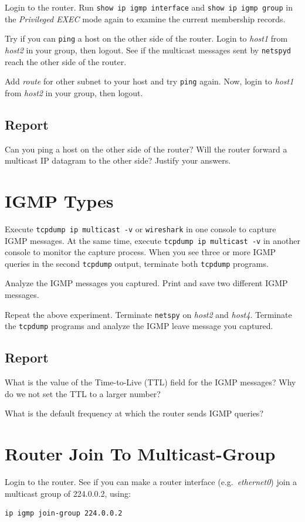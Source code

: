 \documentclass{../UTNetLab}
\begin{document}
    Login to the router.
    Run \lstinline[language={cisco}]{show ip igmp interface} and \lstinline[language={cisco}]{show ip igmp group} in the \textit{Privileged EXEC} mode again to examine the current membership records.

    Try if you can \lstinline{ping} a host on the other side of the router.
    Login to \textit{host1} from \textit{host2} in your group, then logout.
    See if the multicast messages sent by \lstinline{netspyd} reach the other side of the router.

    Add \textit{route} for other subnet to your host and try \lstinline{ping} again. Now, login to \textit{host1} from \textit{host2} in your group, then logout.
    
    \subsection*{Report}
    Can you ping a host on the other side of the router?
    Will the router forward a multicast IP datagram to the other side?
    Justify your answers.

\section{IGMP Types}
    Execute \lstinline{tcpdump ip multicast -v} or \lstinline{wireshark} in one console to capture IGMP messages.
    At the same time, execute \lstinline{tcpdump ip multicast -v} in another console to monitor the capture process.
    When you see three or more IGMP queries in the second \lstinline{tcpdump} output, terminate both \lstinline{tcpdump} programs.

    Analyze the IGMP messages you captured.
    Print and save two different IGMP messages.

    Repeat the above experiment.
    Terminate \lstinline{netspy} on \textit{host2} and \textit{host4}.
    Terminate the \lstinline{tcpdump} programs and analyze the IGMP leave message you captured.
    
    \subsection*{Report}
    What is the value of the Time-to-Live (TTL) field for the IGMP messages?
    Why do we not set the TTL to a larger number?

    What is the default frequency at which the router sends IGMP queries?

\section{Router Join To Multicast-Group}
    Login to the router.
    See if you can make a router interface (e.g.\ \textit{ethernet0}) join a multicast group of 224.0.0.2, using:
    \begin{lstlisting}[language={cisco}]
ip igmp join-group 224.0.0.2
    \end{lstlisting}
    
\end{document}

